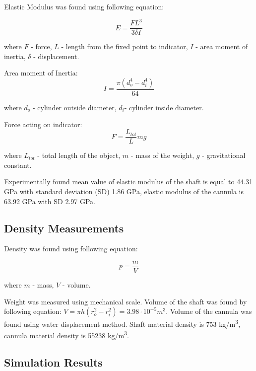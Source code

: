 Elastic Modulus was found using following equation:

\begin{equation}
E = \frac{FL^3}{3 \delta I} 
\end{equation}

where $F$ - force, $L$ - length from the fixed point to indicator, $I$ - area moment of inertia, $\delta$ - displacement.

Area moment of Inertia: 
\begin{equation}
I = \frac{\pi (d_o^4 - d_i^4)}{64}
\end{equation}

where $d_o$ - cylinder outside diameter, $d_i$- cylinder inside diameter.

Force acting on indicator:
\begin{equation}
F = \frac{L_{tot}}{L}mg
\end{equation}

where $L_{tot}$ - total length of the object, $m$ - mass of the weight, $g$ - gravitational constant.

Experimentally found mean value of elastic modulus of the shaft is equal to 44.31 GPa with standard deviation (SD) 1.86 GPa, elastic modulus of the cannula is 63.92 GPa with SD 2.97 GPa.

	\subsection{Density Measurements}
	\label{sec:DenMeas}
Density was found using following equation:

\begin{equation}
p=\frac{m}{V}
\end{equation}

where $m$ - mass, $V$ - volume.

Weight was measured using mechanical scale. Volume of the shaft was found by following equation: $V =  \pi h(r_o^2-r_i^2) = 3.98 \cdot 10^{-5} m^3$. Volume of the cannula was found using water displacement method. Shaft material density is 753 kg/m\textsuperscript{3}, cannula material density is 55238 kg/m\textsuperscript{3}.

\subsection{Simulation Results}
\label{sec:FEAres}

